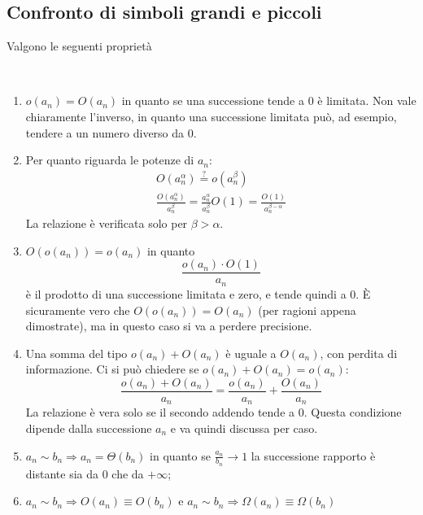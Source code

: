 \subsection{Confronto di simboli grandi e piccoli}
Valgono le seguenti proprietà
\begin{prop} \label{prop:landaugp} ~
	\begin{enumerate}
		\item $o(a_n)=O(a_n)$ in quanto se una successione tende a $0$ è limitata. Non vale chiaramente l'inverso, in quanto una successione limitata può, ad esempio, tendere a un numero diverso da $0$.
		\item Per quanto riguarda le potenze di $a_n$:
		      \begin{gather*}
			      O(a_n^\alpha)\overset{?}{=}o(a_n^\beta)\\
			      \frac{O(a_n^\alpha)}{a_n^\beta}=\frac{a_n^\alpha}{a_n^\beta}O(1)=\frac{O(1)}{a_n^{\beta-\alpha}}
		      \end{gather*}
		      La relazione è verificata solo per $\beta>\alpha$.
		\item $O(o(a_n))=o(a_n)$ in quanto
		      \[
			      \frac{o(a_n)\cdot O(1)}{a_n}
		      \]
		      è il prodotto di una successione limitata e zero, e tende quindi a $0$. È sicuramente vero che $O(o(a_n))=O(a_n)$ (per ragioni appena dimostrate), ma in questo caso si va a perdere precisione.
		\item Una somma del tipo $o(a_n)+O(a_n)$ è uguale a $O(a_n)$, con perdita di informazione. Ci si può chiedere se $o(a_n)+O(a_n)=o(a_n)$:
		      \[
			      \frac{o(a_n)+O(a_n)}{a_n}=\frac{o(a_n)}{a_n}+\frac{O(a_n)}{a_n}
		      \]
		      La relazione è vera solo se il secondo addendo tende a $0$. Questa condizione dipende dalla successione $a_n$ e va quindi discussa per caso.
		\item $a_n\sim b_n\Rightarrow a_n=\Theta(b_n)$ in quanto se $\frac{a_n}{b_n}\to1$ la successione rapporto è distante sia da $0$ che da $+\infty$;
		\item $a_n\sim b_n\Rightarrow O(a_n)\equiv O(b_n)$ e $a_n\sim b_n\Rightarrow \Omega(a_n)\equiv \Omega(b_n)$
	\end{enumerate}
\end{prop}
